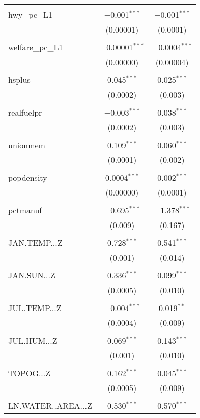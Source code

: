\begin{table}[!htbp]
\begin{tabular}{@{\extracolsep{5pt}}lcc}
  & & \\ 
 hwy\_pc\_L1 & $-$0.001$^{***}$ & $-$0.001$^{***}$ \\ 
  & (0.00001) & (0.0001) \\ 
  & & \\ 
 welfare\_pc\_L1 & $-$0.00001$^{***}$ & $-$0.0004$^{***}$ \\ 
  & (0.00000) & (0.00004) \\ 
  & & \\ 
 hsplus & 0.045$^{***}$ & 0.025$^{***}$ \\ 
  & (0.0002) & (0.003) \\ 
  & & \\ 
 realfuelpr & $-$0.003$^{***}$ & 0.038$^{***}$ \\ 
  & (0.0002) & (0.003) \\ 
  & & \\ 
 unionmem & 0.109$^{***}$ & 0.060$^{***}$ \\ 
  & (0.0001) & (0.002) \\ 
  & & \\ 
 popdensity & 0.0004$^{***}$ & 0.002$^{***}$ \\ 
  & (0.00000) & (0.0001) \\ 
  & & \\ 
 pctmanuf & $-$0.695$^{***}$ & $-$1.378$^{***}$ \\ 
  & (0.009) & (0.167) \\ 
  & & \\ 
 JAN.TEMP...Z & 0.728$^{***}$ & 0.541$^{***}$ \\ 
  & (0.001) & (0.014) \\ 
  & & \\ 
 JAN.SUN...Z & 0.336$^{***}$ & 0.099$^{***}$ \\ 
  & (0.0005) & (0.010) \\ 
  & & \\ 
 JUL.TEMP...Z & $-$0.004$^{***}$ & 0.019$^{**}$ \\ 
  & (0.0004) & (0.009) \\ 
  & & \\ 
 JUL.HUM...Z & 0.069$^{***}$ & 0.143$^{***}$ \\ 
  & (0.001) & (0.010) \\ 
  & & \\ 
 TOPOG...Z & 0.162$^{***}$ & 0.045$^{***}$ \\ 
  & (0.0005) & (0.009) \\ 
  & & \\ 
 LN.WATER..AREA...Z & 0.530$^{***}$ & 0.570$^{***}$ \\ 

\end{tabular}
\end{table}
